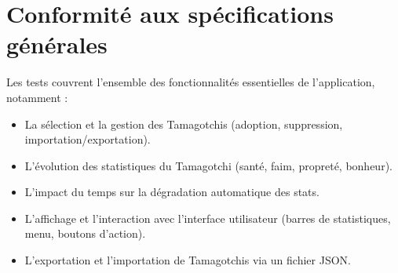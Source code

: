 \documentclass{cahier_de_recette}
\begin{document}
\section{Conformité aux spécifications générales}
Les tests couvrent l’ensemble des fonctionnalités essentielles de l’application, notamment :
\begin{itemize}[label=\textbullet]
\item La sélection et la gestion des Tamagotchis (adoption, suppression, importation/exportation).
\item L’évolution des statistiques du Tamagotchi (santé, faim, propreté, bonheur).
\item L’impact du temps sur la dégradation automatique des stats.
\item L’affichage et l’interaction avec l’interface utilisateur (barres de statistiques, menu, boutons
d’action).
\item L’exportation et l’importation de Tamagotchis via un fichier JSON.
\end{itemize}
\end{document}
